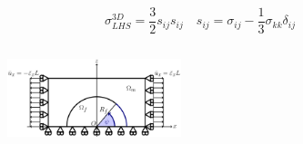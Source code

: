 \documentclass[first,firstsupp,lastsupp,last,hyperref,table]{ETHclass}
\begin{document}
\begin{frame}
\begin{columns}[c]
\begin{column}{0.5\textwidth}
\begin{figure}
\end{figure}
\scriptsize
\begin{equation*}
\sigma^{3D}_{LHS}=\frac{3}{2}s_{ij}s_{ij}\quad s_{ij}=\sigma_{ij}-\frac{1}{3}\sigma_{kk}\delta_{ij}
\end{equation*}
\end{column}
\end{columns}
\vspace{-0.3cm}
\centering
\begin{figure}
\centering
\includegraphics[width=0.45\textwidth]{refAngle.pdf}
\end{figure}
\end{frame}

\addtocounter{framenumber}{-1}
\end{document}
